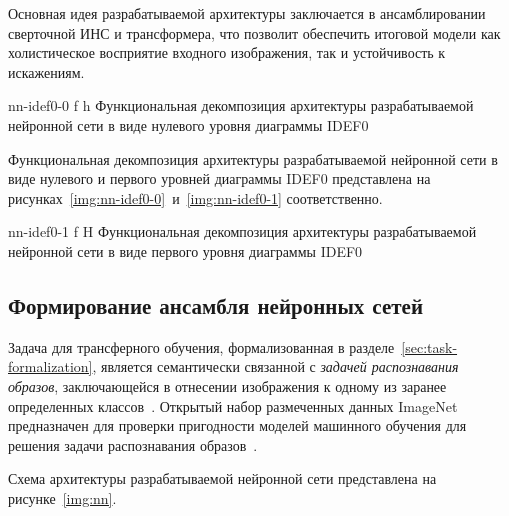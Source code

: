 Основная идея разрабатываемой архитектуры заключается в ансамблировании сверточной ИНС и трансформера, что позволит обеспечить итоговой модели как холистическое восприятие входного изображения, так и устойчивость к искажениям.

{nn-idef0-0}
{f} %
{h}
{\textwidth} %
{Функциональная декомпозиция архитектуры разрабатываемой нейронной сети в виде нулевого уровня диаграммы IDEF0}

Функциональная декомпозиция архитектуры разрабатываемой нейронной сети в виде нулевого и первого уровней диаграммы IDEF0 представлена на рисунках~\ref{img:nn-idef0-0}~и~\ref{img:nn-idef0-1} соответственно.

{nn-idef0-1}
{f} %
{H}
{\textwidth} %
{Функциональная декомпозиция архитектуры разрабатываемой нейронной сети в виде первого уровня диаграммы IDEF0}

\subsection{Формирование ансамбля нейронных сетей}

Задача для трансферного обучения, формализованная в разделе~\ref{sec:task-formalization}, является семантически связанной с \textit{задачей распознавания образов}, заключающейся в отнесении изображения к одному из заранее определенных классов~\cite{rumelhart}. Открытый набор размеченных данных ImageNet~\cite{imagenet} предназначен для проверки пригодности моделей машинного обучения для решения задачи распознавания образов~\cite{imagenet-challenge}.

Схема архитектуры разрабатываемой нейронной сети представлена на рисунке~\ref{img:nn}.

